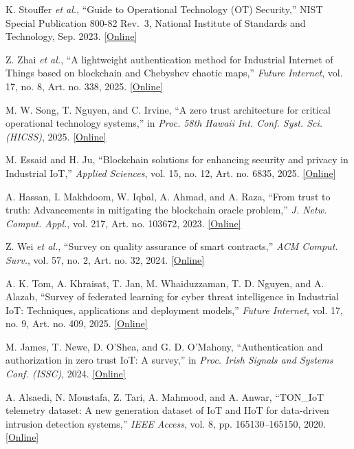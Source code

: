 K. Stouffer \emph{et al.}, ``Guide to Operational Technology (OT) Security,'' NIST Special Publication 800-82 Rev.~3, National Institute of Standards and Technology, Sep. 2023. \href{https://doi.org/10.6028/NIST.SP.800-82r3}{[Online]}

Z. Zhai \emph{et al.}, ``A lightweight authentication method for Industrial Internet of Things based on blockchain and Chebyshev chaotic maps,'' \emph{Future Internet}, vol. 17, no. 8, Art. no. 338, 2025. \href{https://doi.org/10.3390/fi17080338}{[Online]}

M. W. Song, T. Nguyen, and C. Irvine, ``A zero trust architecture for critical operational technology systems,'' in \emph{Proc. 58th Hawaii Int. Conf. Syst. Sci. (HICSS)}, 2025. \href{https://doi.org/10.24251/HICSS.2025.849}{[Online]}

M. Essaid and H. Ju, ``Blockchain solutions for enhancing security and privacy in Industrial IoT,'' \emph{Applied Sciences}, vol. 15, no. 12, Art. no. 6835, 2025. \href{https://doi.org/10.3390/app15126835}{[Online]}

A. Hassan, I. Makhdoom, W. Iqbal, A. Ahmad, and A. Raza, ``From trust to truth: Advancements in mitigating the blockchain oracle problem,'' \emph{J. Netw. Comput. Appl.}, vol. 217, Art. no. 103672, 2023. \href{https://doi.org/10.1016/j.jnca.2023.103672}{[Online]}

Z. Wei \emph{et al.}, ``Survey on quality assurance of smart contracts,'' \emph{ACM Comput. Surv.}, vol. 57, no. 2, Art. no. 32, 2024. \href{https://doi.org/10.1145/3695864}{[Online]}

A. K. Tom, A. Khraisat, T. Jan, M. Whaiduzzaman, T. D. Nguyen, and A. Alazab, ``Survey of federated learning for cyber threat intelligence in Industrial IoT: Techniques, applications and deployment models,'' \emph{Future Internet}, vol. 17, no. 9, Art. no. 409, 2025. \href{https://doi.org/10.3390/fi17090409}{[Online]}

M. James, T. Newe, D. O'Shea, and G. D. O'Mahony, ``Authentication and authorization in zero trust IoT: A survey,'' in \emph{Proc. Irish Signals and Systems Conf. (ISSC)}, 2024. \href{https://doi.org/10.1109/ISSC61953.2024.10603175}{[Online]}

A. Alsaedi, N. Moustafa, Z. Tari, A. Mahmood, and A. Anwar, ``TON\_IoT telemetry dataset: A new generation dataset of IoT and IIoT for data-driven intrusion detection systems,'' \emph{IEEE Access}, vol. 8, pp. 165130--165150, 2020. \href{https://doi.org/10.1109/ACCESS.2020.3022862}{[Online]}


